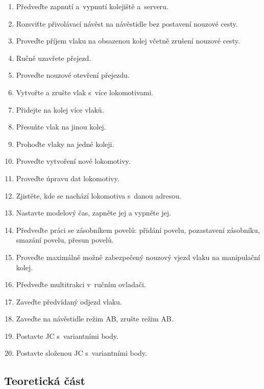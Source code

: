\documentclass[12pt,a4paper]{article}
\begin{document}
\begin{enumerate}[leftmargin=*]
\item Předveďte zapnutí a~vypnutí kolejiště a~serveru.
\item Rozsviťte přivolávací návěst na návěstidle bez postavení nouzové cesty.
\item Proveďte příjem vlaku na obsazenou kolej včetně zrušení nouzové cesty.
\item Ručně uzavřete přejezd.
\item Proveďte nouzové otevření přejezdu.
\item Vytvořte a zrušte vlak s~více lokomotivami.
\item Přidejte na kolej více vlaků.
\item Přesuňte vlak na jinou kolej.
\item Prohoďte vlaky na jedné koleji.
\item Proveďte vytvoření nové lokomotivy.
\item Proveďte úpravu dat lokomotivy.
\item Zjistěte, kde se nachází lokomotiva s~danou adresou.
\item Nastavte modelový čas, zapněte jej a vypněte jej.
\item Předveďte práci se zásobníkem povelů: přidání povelu, pozastavení
zásobníku, smazání povelu, přesun povelů.
\item Proveďte maximálně možně zabezpečený nouzový vjezd vlaku na manipulační
kolej.
\item Předveďte multitrakci v~ručním ovladači.
\item Zaveďte předvídaný odjezd vlaku.
\item Zaveďte na návěstidle režim AB, zrušte režim AB.
\item Postavte JC s~variantními body.
\item Postavte složenou JC s~variantními body.
\end{enumerate}

\newpage
\subsection{Teoretická část}
\end{document}
